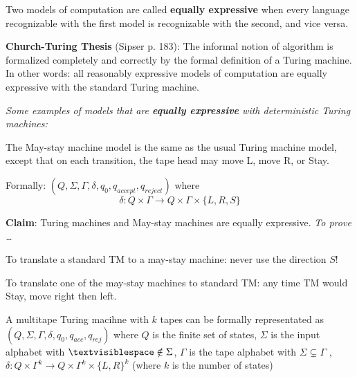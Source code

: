 \documentclass[12pt, oneside]{article}
\begin{document}
\newpage

Two models of computation are called {\bf equally expressive} when 
every language recognizable with the first model is recognizable with the second, and vice versa.

{\bf  Church-Turing Thesis} (Sipser p. 183): The informal notion of algorithm is formalized completely  and correctly by the 
formal definition of a  Turing machine. In other words: all reasonably expressive models of 
computation are equally expressive with the standard Turing machine.


\begin{center}
{\large \it  Some examples of models that are {\bf equally expressive} with deterministic Turing machines: }
\end{center}

\vfill

The May-stay machine model is the same as the usual Turing machine model,  except that
on each transition, the tape head may move L, move R, or Stay. 

Formally: $(Q, \Sigma, \Gamma, \delta, q_0, q_{accept}, q_{reject})$ where 
\[
  \delta: Q \times \Gamma \to Q \times \Gamma \times \{L, R, S\}
\]

{\bf Claim}: Turing machines and May-stay machines are equally expressive. {\it To prove \ldots}

To translate a standard TM to a may-stay machine: never use the direction $S$!


To translate one  of the  may-stay machines to standard TM:
any time TM would Stay, move right  then  left.

\begin{comment}
Formally: suppose $M_S =  (Q, \Sigma, \Gamma, \delta, q_0, q_{acc}, q_{rej})$
has $\delta: Q \times \Gamma \to Q \times \Gamma \times \{L, R, S\}$. Define
the Turing-machine
\[
  M_{new} =  (\phantom{\hspace{2.5in}})
\]

\vfill


\phantom{$M_{new}$ construction here \vspace{400pt}}
\vfill
\end{comment}

\vfill 

 A multitape Turing macihne with $k$ tapes
can be formally representated as 
$(Q, \Sigma,  \Gamma, \delta, q_0, q_{acc}, q_{rej})$ 
where $Q$ is the finite set of  states,
$\Sigma$ is the  input alphabet with  $\textvisiblespace \notin \Sigma$,
$\Gamma$  is the  tape alphabet with $\Sigma \subsetneq \Gamma$ ,
$\delta: Q\times \Gamma^k\to Q \times \Gamma^k \times \{L,R\}^k$ 
(where $k$ is  the number of  states)
\end{document}
